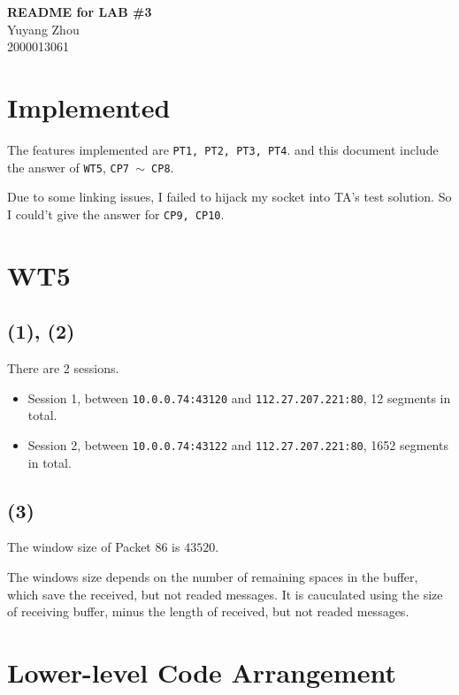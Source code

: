 \documentclass[11pt]{article}
\newcommand{\labid}{3}			%
\newcommand{\name}{Yuyang Zhou} 		%
\newcommand{\id}{2000013061} 	%
\begin{document}
    \pagestyle{fancy}
    \chead{}

    \begin{center}
        {\LARGE \bf README for LAB \#\labid}\\
        {\Large \name}\\
        {\Large \id}\\
    \end{center}

	\section{Implemented}
		\par The features implemented are \texttt{PT1, PT2, PT3, PT4}. and this document include the answer of \texttt{WT5}, \texttt{CP7 $\sim$ CP8}.
		
		\par Due to some linking issues, I failed to hijack my socket into TA's test solution. So I could't give the answer for \texttt{CP9, CP10}.
	
	\section{WT5}
	
		\subsection*{(1), (2)}
			There are 2 sessions.
			
			\begin{itemize}
				\item Session 1, between \texttt{10.0.0.74:43120} and \texttt{112.27.207.221:80}, 12 segments in total.
				\item Session 2, between \texttt{10.0.0.74:43122} and \texttt{112.27.207.221:80}, 1652 segments in total.
			\end{itemize}
		\subsection*{(3)}
			 The window size of Packet 86 is $43520$.
			 
			 The windows size depends on the number of remaining spaces in the buffer, which save the received, but not readed messages. It is cauculated using the size of receiving buffer, minus the length of received, but not readed messages.
	
	\section{Lower-level Code Arrangement}
	
\end{document}

